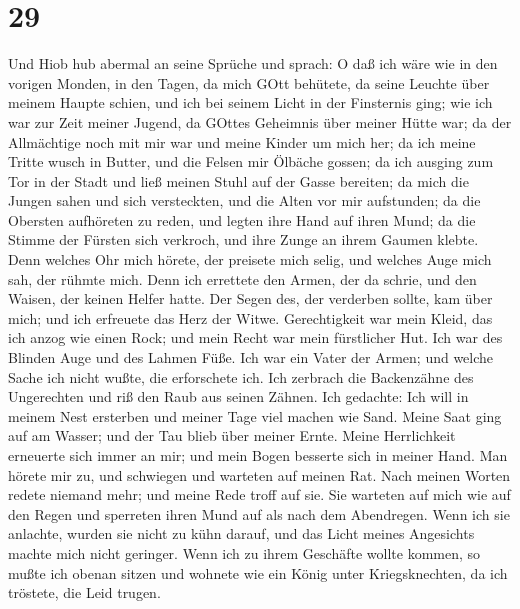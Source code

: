 \hypertarget{section-28}{%
\section{29}\label{section-28}}

 Und Hiob hub abermal an seine Sprüche und sprach:
 O daß ich wäre wie in den vorigen Monden, in den Tagen, da
mich GOtt behütete,  da seine Leuchte über meinem Haupte
schien, und ich bei seinem Licht in der Finsternis ging; 
wie ich war zur Zeit meiner Jugend, da GOttes Geheimnis über meiner
Hütte war;  da der Allmächtige noch mit mir war und meine
Kinder um mich her;  da ich meine Tritte wusch in Butter,
und die Felsen mir Ölbäche gossen;  da ich ausging zum Tor
in der Stadt und ließ meinen Stuhl auf der Gasse bereiten; 
da mich die Jungen sahen und sich versteckten, und die Alten vor mir
aufstunden;  da die Obersten aufhöreten zu reden, und legten
ihre Hand auf ihren Mund;  da die Stimme der Fürsten sich
verkroch, und ihre Zunge an ihrem Gaumen klebte.  Denn
welches Ohr mich hörete, der preisete mich selig, und welches Auge mich
sah, der rühmte mich.  Denn ich errettete den Armen, der da
schrie, und den Waisen, der keinen Helfer hatte.  Der Segen
des, der verderben sollte, kam über mich; und ich erfreuete das Herz der
Witwe.  Gerechtigkeit war mein Kleid, das ich anzog wie
einen Rock; und mein Recht war mein fürstlicher Hut.  Ich
war des Blinden Auge und des Lahmen Füße.  Ich war ein
Vater der Armen; und welche Sache ich nicht wußte, die erforschete ich.
 Ich zerbrach die Backenzähne des Ungerechten und riß den
Raub aus seinen Zähnen.  Ich gedachte: Ich will in meinem
Nest ersterben und meiner Tage viel machen wie Sand.  Meine
Saat ging auf am Wasser; und der Tau blieb über meiner Ernte.
 Meine Herrlichkeit erneuerte sich immer an mir; und mein
Bogen besserte sich in meiner Hand.  Man hörete mir zu, und
schwiegen und warteten auf meinen Rat.  Nach meinen Worten
redete niemand mehr; und meine Rede troff auf sie.  Sie
warteten auf mich wie auf den Regen und sperreten ihren Mund auf als
nach dem Abendregen.  Wenn ich sie anlachte, wurden sie
nicht zu kühn darauf, und das Licht meines Angesichts machte mich nicht
geringer.  Wenn ich zu ihrem Geschäfte wollte kommen, so
mußte ich obenan sitzen und wohnete wie ein König unter Kriegsknechten,
da ich tröstete, die Leid trugen.

